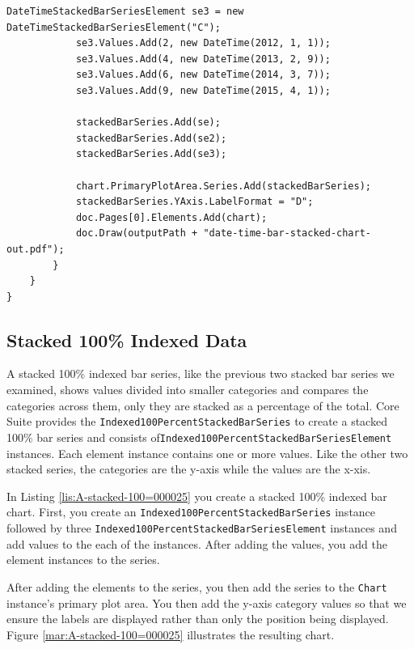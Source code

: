 \documentclass[american,letterpaper]{tufte-book}
\numberwithin{equation}{section}
\numberwithin{figure}{section}
\begin{document}
{\begin{lstlisting}[caption={A date/time stacked bar chart.},label={lis:A-date/time-stacked},basicstyle={\small\ttfamily},breaklines=true]
            DateTimeStackedBarSeriesElement se3 = new DateTimeStackedBarSeriesElement("C");
            se3.Values.Add(2, new DateTime(2012, 1, 1));
            se3.Values.Add(4, new DateTime(2013, 2, 9));
            se3.Values.Add(6, new DateTime(2014, 3, 7));
            se3.Values.Add(9, new DateTime(2015, 4, 1));

            stackedBarSeries.Add(se);
            stackedBarSeries.Add(se2);
            stackedBarSeries.Add(se3);
                        
            chart.PrimaryPlotArea.Series.Add(stackedBarSeries);
            stackedBarSeries.YAxis.LabelFormat = "D";
            doc.Pages[0].Elements.Add(chart);
            doc.Draw(outputPath + "date-time-bar-stacked-chart-out.pdf");
        }
    }
}
\end{lstlisting}
\leavevmode\egroup

\subsection{Stacked 100\% Indexed Data}

A stacked 100\% indexed bar series, like the previous two stacked
bar series we examined, shows values divided into smaller categories
and compares the categories across them, only they are stacked as
a percentage of the total. Core Suite provides the \texttt{Indexed100PercentStackedBarSeries}
to create a stacked 100\% bar series and consists of\linebreak \texttt{Indexed100PercentStackedBarSeriesElement} instances.
Each element instance contains one or more values. Like the other
two stacked series, the categories are the y-axis while the values
are the x-xis.

In Listing \ref{lis:A-stacked-100=000025} you create a stacked 100\%
indexed bar chart. First, you create an \texttt{Indexed100PercentStackedBarSeries}
instance followed by three \texttt{Indexed100PercentStackedBarSeriesElement}
instances and add values to the each of the instances. After adding
the values, you add the element instances to the series.

After adding the elements to the series, you then add the series to
the \texttt{Chart} instance's primary plot area. You then add the y-axis
category values so that we ensure the labels are displayed rather
than only the position being displayed. Figure \ref{mar:A-stacked-100=000025}
illustrates the resulting chart.

}
\end{document}
